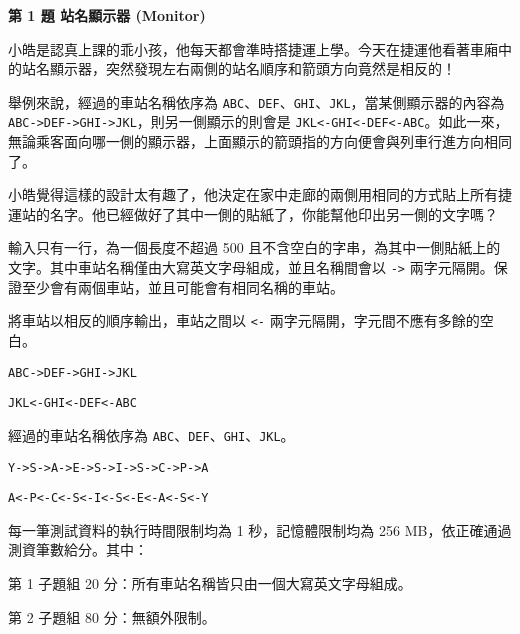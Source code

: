 \documentclass[12pt]{article}
\begin{document}
\Large
\begin{center}
    \textbf{第 1 題 \hspace{12pt} 站名顯示器 (Monitor)}
\end{center}
\normalsize


小皓是認真上課的乖小孩，他每天都會準時搭捷運上學。今天在捷運他看著車廂中的站名顯示器，突然發現左右兩側的站名順序和箭頭方向竟然是相反的！

舉例來說，經過的車站名稱依序為 \texttt{ABC}、\texttt{DEF}、\texttt{GHI}、\texttt{JKL}，當某側顯示器的內容為 \texttt{ABC->DEF->GHI->JKL}，則另一側顯示的則會是 \texttt{JKL<-GHI<-DEF<-ABC}。如此一來，無論乘客面向哪一側的顯示器，上面顯示的箭頭指的方向便會與列車行進方向相同了。

小皓覺得這樣的設計太有趣了，他決定在家中走廊的兩側用相同的方式貼上所有捷運站的名字。他已經做好了其中一側的貼紙了，你能幫他印出另一側的文字嗎？


輸入只有一行，為一個長度不超過 500 且不含空白的字串，為其中一側貼紙上的文字。其中車站名稱僅由大寫英文字母組成，並且名稱間會以 \texttt{->} 兩字元隔開。保證至少會有兩個車站，並且可能會有相同名稱的車站。


將車站以相反的順序輸出，車站之間以 \texttt{<-} 兩字元隔開，字元間不應有多餘的空白。

\begin{multicols}{2}


\begin{lstlisting}
ABC->DEF->GHI->JKL
\end{lstlisting}


\begin{lstlisting}
JKL<-GHI<-DEF<-ABC
\end{lstlisting}


經過的車站名稱依序為 \texttt{ABC}、\texttt{DEF}、\texttt{GHI}、\texttt{JKL}。

\columnbreak


\begin{lstlisting}
Y->S->A->E->S->I->S->C->P->A
\end{lstlisting}


\begin{lstlisting}
A<-P<-C<-S<-I<-S<-E<-A<-S<-Y
\end{lstlisting}

\end{multicols}


每一筆測試資料的執行時間限制均為 1 秒，記憶體限制均為 256 MB，依正確通過測資筆數給分。其中：

第 1 子題組 20 分：所有車站名稱皆只由一個大寫英文字母組成。

第 2 子題組 80 分：無額外限制。
\end{document}
